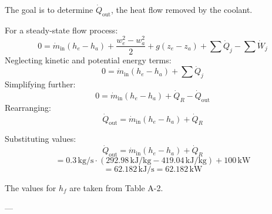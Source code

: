 The goal is to determine \( \dot{Q}_{\text{out}} \), the heat flow removed by the coolant.  

For a steady-state flow process:  
\[
0 = \dot{m}_{\text{in}} (h_e - h_a) + \frac{w_e^2 - w_a^2}{2} + g(z_e - z_a) + \sum \dot{Q}_j - \sum \dot{W}_j
\]  
Neglecting kinetic and potential energy terms:  
\[
0 = \dot{m}_{\text{in}} (h_e - h_a) + \sum \dot{Q}_j
\]  
Simplifying further:  
\[
0 = \dot{m}_{\text{in}} (h_e - h_a) + \dot{Q}_R - \dot{Q}_{\text{out}}
\]  
Rearranging:  
\[
\dot{Q}_{\text{out}} = \dot{m}_{\text{in}} (h_e - h_a) + \dot{Q}_R
\]  

Substituting values:  
\[
\dot{Q}_{\text{out}} = \dot{m}_{\text{in}} (h_e - h_a) + \dot{Q}_R
\]  
\[
= 0.3 \, \text{kg/s} \cdot (292.98 \, \text{kJ/kg} - 419.04 \, \text{kJ/kg}) + 100 \, \text{kW}
\]  
\[
= 62.182 \, \text{kJ/s} = 62.182 \, \text{kW}
\]  

The values for \( h_f \) are taken from Table A-2.  

---